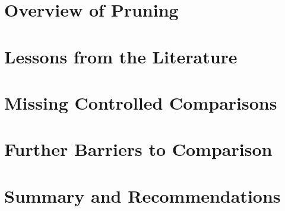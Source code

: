 \section{Overview of Pruning}

% 


\vspace{-2mm}
\section{Lessons from the Literature} \label{sec:lessons}
\vspace{-.5mm}

% 


\section{Missing Controlled Comparisons}



\section{Further Barriers to Comparison}



\section{Summary and Recommendations}




